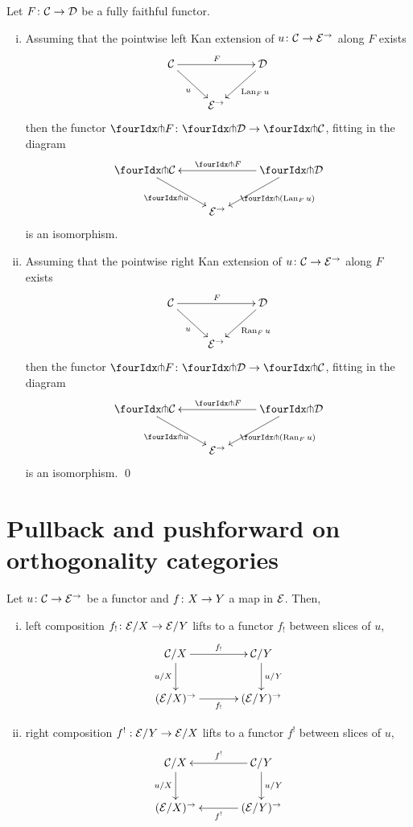\documentclass[reqno,10pt,a4paper,oneside]{amsart}
\begin{document}
\begin{proposition} Let $F \colon \mathcal{C} \to \mathcal{D}$ be a fully faithful functor. 
\label{kan-extension-closure}
\begin{enumerate}[(i)]
\item Assuming that the pointwise left Kan extension of 
$u \colon \mathcal{C} \to \mathcal{E}^{\to}$ along $F$ exists
\[
\xymatrix{
  \cal{C}
  \ar[dr]_{u}
  \ar[rr]^{F}
&&
  \cal{D}
  \ar[dl]^{\Lan_F u}
\\&
  \catE^{\to}
}
\]
then the functor $\liftr{F} \co \liftr{\cal{D}} \to \liftr{\cal{C}}$,  fitting in the diagram
\[
\xymatrix{
  \liftr{\cal{C}}
  \ar[dr]_{\liftr{u}}
&&
  \liftr{\cal{D}}
  \ar[ll]_{\liftr{F}}
  \ar[dl]^{\liftr{(\Lan_F u)}}
\\&
  \catE^{\to}
}
\]
is an isomorphism.
\item Assuming that the pointwise right Kan extension of 
$u \colon \mathcal{C} \to \mathcal{E}^{\to}$ along $F$ exists
\[
\xymatrix{
  \cal{C}
  \ar[dr]_{u}
  \ar[rr]^{F}
&&
  \cal{D}
  \ar[dl]^{\Ran_F u}
\\&
  \catE^{\to}
}
\]
then the functor $\liftl{F} \co \liftl{\cal{D}} \to \liftl{\cal{C}}$, fitting in the diagram
\[
\xymatrix{
  \liftl{\cal{C}}
  \ar[dr]_{\liftl{u}}
&&
  \liftl{\cal{D}}
  \ar[ll]_{\liftl{F}}
  \ar[dl]^{\liftl{(\Ran_F u)}}
\\&
  \catE^{\to}
}
\]
is an isomorphism. \qed
\end{enumerate}
\end{proposition}



\section{Pullback and pushforward on orthogonality categories}

\begin{lemma}
\label{slicing-2-functorial}
Let $u \colon \mathcal{C} \to \mathcal{E}^{\to}$ be a functor and $f \colon X \to Y$ a map in $\mathcal{E}$. Then, 
\begin{enumerate}[(i)]
\item left composition $f_! \colon \mathcal{E}/X \to \mathcal{E}/Y$ lifts to a functor $f_!$ between slices of $u$,
\[
\xymatrix@C+1em{
  \cal{C}/X
  \ar[r]^-{f_!}
  \ar[d]_{u/X}
&
  \cal{C}/Y
  \ar[d]^{u/Y}
\\
  (\calE/X)^{\to}
  \ar[r]_-{f_!}
&
  (\calE/Y)^{\to}
}
\]
\item right composition $f^! : \mathcal{E}/Y \to \mathcal{E}/X$ lifts to a functor $f^!$ between slices of $u$,
\[
\xymatrix@C+1em{
  \cal{C}/X
  \ar[d]_{u/X}
&
  \cal{C}/Y
  \ar[l]_-{f^!}
  \ar[d]^{u/Y}
\\
  (\calE/X)^{\to}
&
  (\calE/Y)^{\to}
  \ar[l]^-{f^!}
}
\]
\end{enumerate}
\end{lemma}
\end{document}
